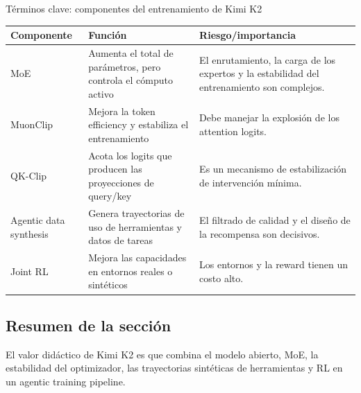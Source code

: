 \begin{knowledgebox}{Términos clave: componentes del entrenamiento de Kimi K2}
\begin{tabularx}{\textwidth}{p{}p{}X}
\toprule
Componente & Función & Riesgo/importancia \\
\midrule
MoE & Aumenta el total de parámetros, pero controla el cómputo activo & El enrutamiento, la carga de los expertos y la estabilidad del entrenamiento son complejos. \\
MuonClip & Mejora la token efficiency y estabiliza el entrenamiento & Debe manejar la explosión de los attention logits. \\
QK-Clip & Acota los logits que producen las proyecciones de query/key & Es un mecanismo de estabilización de intervención mínima. \\
Agentic data synthesis & Genera trayectorias de uso de herramientas y datos de tareas & El filtrado de calidad y el diseño de la recompensa son decisivos. \\
Joint RL & Mejora las capacidades en entornos reales o sintéticos & Los entornos y la reward tienen un costo alto. \\
\bottomrule
\end{tabularx}
\end{knowledgebox}

\subsection{Resumen de la sección}

El valor didáctico de Kimi K2 es que combina el modelo abierto, MoE, la estabilidad del optimizador, las trayectorias sintéticas de herramientas y RL en un agentic training pipeline.

